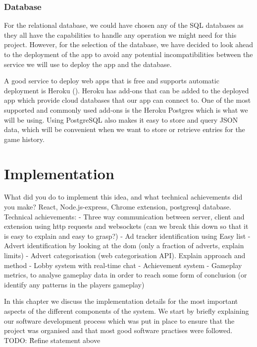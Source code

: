\documentclass{l4proj}
\begin{document}
\subsection{Database}
For the relational database, we could have chosen any of the SQL databases as they all have the capabilities to handle any operation we might need for this project. However, for the selection of the database, we have decided to look ahead to the deployment of the 
app to avoid any potential incompatibilities between the service we will use to deploy the app and the database. 

A good service to deploy web apps that is free and supports automatic deployment is Heroku (\cite{heroku}). Heroku has add-ons that can be added to the deployed app which provide cloud databases that
our app can connect to. One of the most supported and commonly used add-ons is the Heroku Postgres which is what we will be using. Using PostgreSQL also makes it easy to store and query JSON data, which will be convenient when we want to store or retrieve entries for the game history.

\chapter{Implementation}
\label{implementation}
What did you do to implement this idea, and what technical achievements did you make? 
React, Node.js-express, Chrome extension, postgresql database. 
Technical achievements:
- Three way communication between server, client and extension using http requests and websockets (can we break this down so that it is easy to explain and easy to grasp?)
- Ad tracker identification using Easy list
- Advert identification by looking at the dom (only a fraction of adverts, explain limits)
- Advert categorisation (web categorisation API). Explain approach and method
- Lobby system with real-time chat
- Achievement system
- Gameplay metrics, to analyse gameplay data in order to reach some form of conclusion (or identify any patterns in the players gameplay)

In this chapter we discuss the implementation details for the most important aspects of the different components of the system. We start by briefly explaining our software development process which was put in place to ensure that the project was organised and that most good software practises were followed.
TODO: \^ Refine statement above
\end{document}
